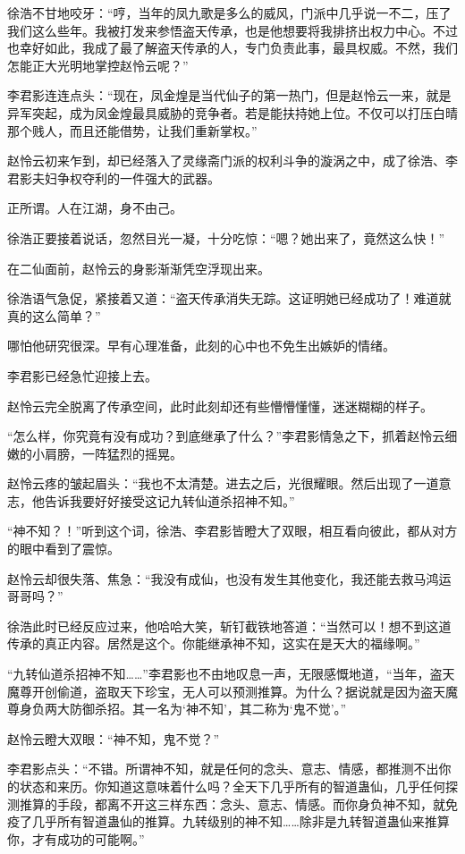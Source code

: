 \begin{this_body}
徐浩不甘地咬牙：“哼，当年的凤九歌是多么的威风，门派中几乎说一不二，压了我们这么些年。我被打发来参悟盗天传承，也是他想要将我排挤出权力中心。不过也幸好如此，我成了最了解盗天传承的人，专门负责此事，最具权威。不然，我们怎能正大光明地掌控赵怜云呢？”

李君影连连点头：“现在，凤金煌是当代仙子的第一热门，但是赵怜云一来，就是异军突起，成为凤金煌最具威胁的竞争者。若是能扶持她上位。不仅可以打压白晴那个贱人，而且还能借势，让我们重新掌权。”

赵怜云初来乍到，却已经落入了灵缘斋门派的权利斗争的漩涡之中，成了徐浩、李君影夫妇争权夺利的一件强大的武器。

正所谓。人在江湖，身不由己。

徐浩正要接着说话，忽然目光一凝，十分吃惊：“嗯？她出来了，竟然这么快！”

在二仙面前，赵怜云的身影渐渐凭空浮现出来。

徐浩语气急促，紧接着又道：“盗天传承消失无踪。这证明她已经成功了！难道就真的这么简单？”

哪怕他研究很深。早有心理准备，此刻的心中也不免生出嫉妒的情绪。

李君影已经急忙迎接上去。

赵怜云完全脱离了传承空间，此时此刻却还有些懵懵懂懂，迷迷糊糊的样子。

“怎么样，你究竟有没有成功？到底继承了什么？”李君影情急之下，抓着赵怜云细嫩的小肩膀，一阵猛烈的摇晃。

赵怜云疼的皱起眉头：“我也不太清楚。进去之后，光很耀眼。然后出现了一道意志，他告诉我要好好接受这记九转仙道杀招神不知。”

“神不知？！”听到这个词，徐浩、李君影皆瞪大了双眼，相互看向彼此，都从对方的眼中看到了震惊。

赵怜云却很失落、焦急：“我没有成仙，也没有发生其他变化，我还能去救马鸿运哥哥吗？”

徐浩此时已经反应过来，他哈哈大笑，斩钉截铁地答道：“当然可以！想不到这道传承的真正内容。居然是这个。你能继承神不知，这实在是天大的福缘啊。”

“九转仙道杀招神不知……”李君影也不由地叹息一声，无限感慨地道，“当年，盗天魔尊开创偷道，盗取天下珍宝，无人可以预测推算。为什么？据说就是因为盗天魔尊身负两大防御杀招。其一名为‘神不知’，其二称为‘鬼不觉’。”

赵怜云瞪大双眼：“神不知，鬼不觉？”

李君影点头：“不错。所谓神不知，就是任何的念头、意志、情感，都推测不出你的状态和来历。你知道这意味着什么吗？全天下几乎所有的智道蛊仙，几乎任何探测推算的手段，都离不开这三样东西：念头、意志、情感。而你身负神不知，就免疫了几乎所有智道蛊仙的推算。九转级别的神不知……除非是九转智道蛊仙来推算你，才有成功的可能啊。”


\end{this_body}
